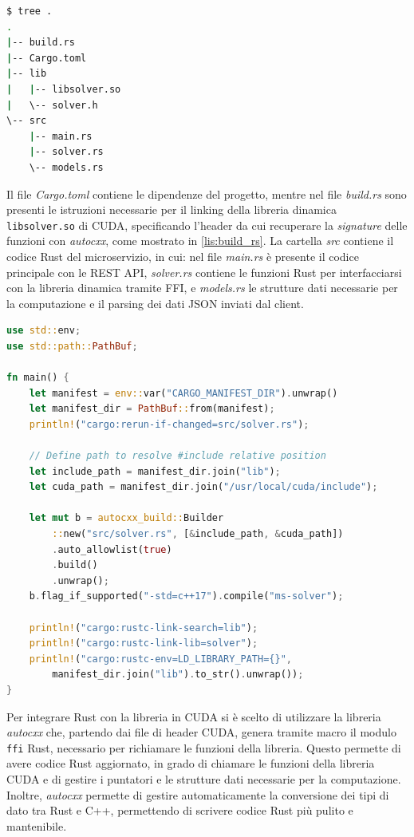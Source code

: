 \vspace{5mm}
\begin{lstlisting}[language=bash, caption=Directory del progetto, label=lis:tree]
$ tree .
.
|-- build.rs
|-- Cargo.toml
|-- lib
|   |-- libsolver.so
|   \-- solver.h
\-- src
    |-- main.rs
    |-- solver.rs
    \-- models.rs
\end{lstlisting}
\vspace{5mm}

Il file \textit{Cargo.toml} contiene le dipendenze del progetto, mentre nel file \textit{build.rs} sono presenti le istruzioni necessarie per il linking della libreria dinamica \verb|libsolver.so| di \gls{CUDA}, specificando l'header da cui recuperare la \textit{signature} delle funzioni con \textit{autocxx}, come mostrato in \ref{lis:build_rs}. La cartella \textit{src} contiene il codice Rust del microservizio, in cui: nel file \textit{main.rs} è presente il codice principale con le REST \gls{API}, \textit{solver.rs} contiene le funzioni Rust per interfacciarsi con la libreria dinamica tramite \gls{FFI}, e \textit{models.rs} le strutture dati necessarie per la computazione e il parsing dei dati \gls{JSON} inviati dal client.

\newpage
\vspace{5mm}
\begin{lstlisting}[language=Rust, caption=build.rs, label=lis:build_rs]
use std::env;
use std::path::PathBuf;

fn main() {
    let manifest = env::var("CARGO_MANIFEST_DIR").unwrap()
    let manifest_dir = PathBuf::from(manifest);
    println!("cargo:rerun-if-changed=src/solver.rs");

    // Define path to resolve #include relative position
    let include_path = manifest_dir.join("lib");
    let cuda_path = manifest_dir.join("/usr/local/cuda/include");

    let mut b = autocxx_build::Builder
        ::new("src/solver.rs", [&include_path, &cuda_path])
        .auto_allowlist(true)
        .build()
        .unwrap();
    b.flag_if_supported("-std=c++17").compile("ms-solver");

    println!("cargo:rustc-link-search=lib");
    println!("cargo:rustc-link-lib=solver");
    println!("cargo:rustc-env=LD_LIBRARY_PATH={}",
        manifest_dir.join("lib").to_str().unwrap());
}
\end{lstlisting}
\vspace{5mm}


Per integrare Rust con la libreria in \gls{CUDA} si è scelto di utilizzare la libreria \textit{autocxx} che, partendo dai file di header \gls{CUDA}, genera tramite macro il modulo \verb|ffi| Rust, necessario per richiamare le funzioni della libreria. Questo permette di avere codice Rust aggiornato, in grado di chiamare le funzioni della libreria \gls{CUDA} e di gestire i puntatori e le strutture dati necessarie per la computazione. Inoltre, \textit{autocxx} permette di gestire automaticamente la conversione dei tipi di dato tra Rust e C++, permettendo di scrivere codice Rust più pulito e mantenibile.

